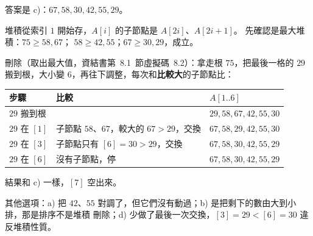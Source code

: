 \begin{pastsoln}
答案是 c)：$67, 58, 30, 42, 55, 29$。

堆積從索引 $1$ 開始存，$A[i]$ 的子節點是 $A[2i]$、$A[2i+1]$。 先確認是最大堆積：$75 \ge 58, 67$；
$58 \ge 42, 55$；$67 \ge 30, 29$，成立。

刪除（取出最大值，資結書第~8.1~節虛擬碼~8.2）：拿走根 $75$，把最後一格的 $29$ 搬到根，大小變
$6$，再往下調整，每次和\textbf{比較大}的子節點比：
\begin{center}
\begin{tabular}{lll}
\toprule
步驟 & 比較 & $A[1..6]$ \\
\midrule
$29$ 搬到根 & & $29, 58, 67, 42, 55, 30$ \\
$29$ 在 $[1]$ & 子節點 $58$、$67$，較大的 $67 > 29$，交換 & $67, 58, 29, 42, 55, 30$ \\
$29$ 在 $[3]$ & 子節點只有 $[6] = 30 > 29$，交換 & $67, 58, 30, 42, 55, 29$ \\
$29$ 在 $[6]$ & 沒有子節點，停 & $67, 58, 30, 42, 55, 29$ \\
\bottomrule
\end{tabular}
\end{center}
結果和 c) 一樣，$[7]$ 空出來。

其他選項：a) 把 $42$、$55$ 對調了，但它們沒有動過；b) 是把剩下的數由大到小排，那是排序不是堆積
刪除；d) 少做了最後一次交換，$[3] = 29 < [6] = 30$ 違反堆積性質。
\end{pastsoln}

